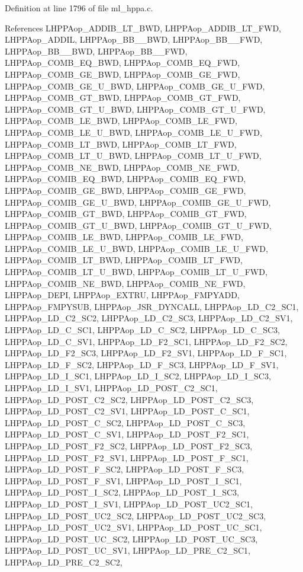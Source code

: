 Definition at line 1796 of file ml\_\-hppa.c.

References LHPPAop\_\-ADDIB\_\-LT\_\-BWD, LHPPAop\_\-ADDIB\_\-LT\_\-FWD, LHPPAop\_\-ADDIL, LHPPAop\_\-BB\_\_\-BWD, LHPPAop\_\-BB\_\_\-FWD, LHPPAop\_\-BB\_\_\-BWD, LHPPAop\_\-BB\_\_\-FWD, LHPPAop\_\-COMB\_\-EQ\_\-BWD, LHPPAop\_\-COMB\_\-EQ\_\-FWD, LHPPAop\_\-COMB\_\-GE\_\-BWD, LHPPAop\_\-COMB\_\-GE\_\-FWD, LHPPAop\_\-COMB\_\-GE\_\-U\_\-BWD, LHPPAop\_\-COMB\_\-GE\_\-U\_\-FWD, LHPPAop\_\-COMB\_\-GT\_\-BWD, LHPPAop\_\-COMB\_\-GT\_\-FWD, LHPPAop\_\-COMB\_\-GT\_\-U\_\-BWD, LHPPAop\_\-COMB\_\-GT\_\-U\_\-FWD, LHPPAop\_\-COMB\_\-LE\_\-BWD, LHPPAop\_\-COMB\_\-LE\_\-FWD, LHPPAop\_\-COMB\_\-LE\_\-U\_\-BWD, LHPPAop\_\-COMB\_\-LE\_\-U\_\-FWD, LHPPAop\_\-COMB\_\-LT\_\-BWD, LHPPAop\_\-COMB\_\-LT\_\-FWD, LHPPAop\_\-COMB\_\-LT\_\-U\_\-BWD, LHPPAop\_\-COMB\_\-LT\_\-U\_\-FWD, LHPPAop\_\-COMB\_\-NE\_\-BWD, LHPPAop\_\-COMB\_\-NE\_\-FWD, LHPPAop\_\-COMIB\_\-EQ\_\-BWD, LHPPAop\_\-COMIB\_\-EQ\_\-FWD, LHPPAop\_\-COMIB\_\-GE\_\-BWD, LHPPAop\_\-COMIB\_\-GE\_\-FWD, LHPPAop\_\-COMIB\_\-GE\_\-U\_\-BWD, LHPPAop\_\-COMIB\_\-GE\_\-U\_\-FWD, LHPPAop\_\-COMIB\_\-GT\_\-BWD, LHPPAop\_\-COMIB\_\-GT\_\-FWD, LHPPAop\_\-COMIB\_\-GT\_\-U\_\-BWD, LHPPAop\_\-COMIB\_\-GT\_\-U\_\-FWD, LHPPAop\_\-COMIB\_\-LE\_\-BWD, LHPPAop\_\-COMIB\_\-LE\_\-FWD, LHPPAop\_\-COMIB\_\-LE\_\-U\_\-BWD, LHPPAop\_\-COMIB\_\-LE\_\-U\_\-FWD, LHPPAop\_\-COMIB\_\-LT\_\-BWD, LHPPAop\_\-COMIB\_\-LT\_\-FWD, LHPPAop\_\-COMIB\_\-LT\_\-U\_\-BWD, LHPPAop\_\-COMIB\_\-LT\_\-U\_\-FWD, LHPPAop\_\-COMIB\_\-NE\_\-BWD, LHPPAop\_\-COMIB\_\-NE\_\-FWD, LHPPAop\_\-DEPI, LHPPAop\_\-EXTRU, LHPPAop\_\-FMPYADD, LHPPAop\_\-FMPYSUB, LHPPAop\_\-JSR\_\-DYNCALL, LHPPAop\_\-LD\_\-C2\_\-SC1, LHPPAop\_\-LD\_\-C2\_\-SC2, LHPPAop\_\-LD\_\-C2\_\-SC3, LHPPAop\_\-LD\_\-C2\_\-SV1, LHPPAop\_\-LD\_\-C\_\-SC1, LHPPAop\_\-LD\_\-C\_\-SC2, LHPPAop\_\-LD\_\-C\_\-SC3, LHPPAop\_\-LD\_\-C\_\-SV1, LHPPAop\_\-LD\_\-F2\_\-SC1, LHPPAop\_\-LD\_\-F2\_\-SC2, LHPPAop\_\-LD\_\-F2\_\-SC3, LHPPAop\_\-LD\_\-F2\_\-SV1, LHPPAop\_\-LD\_\-F\_\-SC1, LHPPAop\_\-LD\_\-F\_\-SC2, LHPPAop\_\-LD\_\-F\_\-SC3, LHPPAop\_\-LD\_\-F\_\-SV1, LHPPAop\_\-LD\_\-I\_\-SC1, LHPPAop\_\-LD\_\-I\_\-SC2, LHPPAop\_\-LD\_\-I\_\-SC3, LHPPAop\_\-LD\_\-I\_\-SV1, LHPPAop\_\-LD\_\-POST\_\-C2\_\-SC1, LHPPAop\_\-LD\_\-POST\_\-C2\_\-SC2, LHPPAop\_\-LD\_\-POST\_\-C2\_\-SC3, LHPPAop\_\-LD\_\-POST\_\-C2\_\-SV1, LHPPAop\_\-LD\_\-POST\_\-C\_\-SC1, LHPPAop\_\-LD\_\-POST\_\-C\_\-SC2, LHPPAop\_\-LD\_\-POST\_\-C\_\-SC3, LHPPAop\_\-LD\_\-POST\_\-C\_\-SV1, LHPPAop\_\-LD\_\-POST\_\-F2\_\-SC1, LHPPAop\_\-LD\_\-POST\_\-F2\_\-SC2, LHPPAop\_\-LD\_\-POST\_\-F2\_\-SC3, LHPPAop\_\-LD\_\-POST\_\-F2\_\-SV1, LHPPAop\_\-LD\_\-POST\_\-F\_\-SC1, LHPPAop\_\-LD\_\-POST\_\-F\_\-SC2, LHPPAop\_\-LD\_\-POST\_\-F\_\-SC3, LHPPAop\_\-LD\_\-POST\_\-F\_\-SV1, LHPPAop\_\-LD\_\-POST\_\-I\_\-SC1, LHPPAop\_\-LD\_\-POST\_\-I\_\-SC2, LHPPAop\_\-LD\_\-POST\_\-I\_\-SC3, LHPPAop\_\-LD\_\-POST\_\-I\_\-SV1, LHPPAop\_\-LD\_\-POST\_\-UC2\_\-SC1, LHPPAop\_\-LD\_\-POST\_\-UC2\_\-SC2, LHPPAop\_\-LD\_\-POST\_\-UC2\_\-SC3, LHPPAop\_\-LD\_\-POST\_\-UC2\_\-SV1, LHPPAop\_\-LD\_\-POST\_\-UC\_\-SC1, LHPPAop\_\-LD\_\-POST\_\-UC\_\-SC2, LHPPAop\_\-LD\_\-POST\_\-UC\_\-SC3, LHPPAop\_\-LD\_\-POST\_\-UC\_\-SV1, LHPPAop\_\-LD\_\-PRE\_\-C2\_\-SC1, LHPPAop\_\-LD\_\-PRE\_\-C2\_\-SC2, 